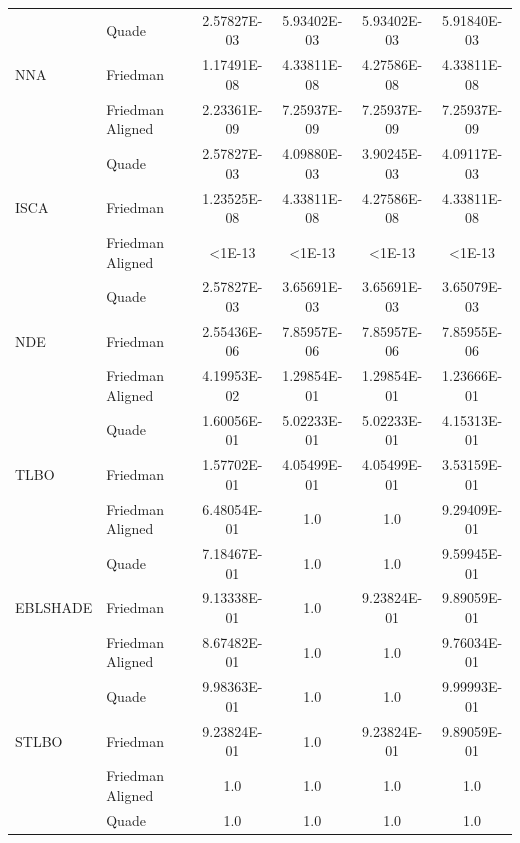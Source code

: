 \documentclass[a4paper,fleqn]{cas-dc}
\begin{document}
\begin{table}[<options>]
\begin{tabular*}{\tblwidth}{@{}LLCCCC@{}}
&Quade&2.57827E-03&5.93402E-03&5.93402E-03&5.91840E-03\\
NNA&Friedman&1.17491E-08&4.33811E-08&4.27586E-08&4.33811E-08\\
&Friedman Aligned&2.23361E-09&7.25937E-09&7.25937E-09&7.25937E-09\\
&Quade&2.57827E-03&4.09880E-03&3.90245E-03&4.09117E-03\\
ISCA&Friedman&1.23525E-08&4.33811E-08&4.27586E-08&4.33811E-08\\
&Friedman Aligned&<1E-13&<1E-13&<1E-13&<1E-13\\
&Quade&2.57827E-03&3.65691E-03&3.65691E-03&3.65079E-03\\
NDE&Friedman&2.55436E-06&7.85957E-06&7.85957E-06&7.85955E-06\\
&Friedman Aligned&4.19953E-02&1.29854E-01&1.29854E-01&1.23666E-01\\
&Quade&1.60056E-01&5.02233E-01&5.02233E-01&4.15313E-01\\
TLBO&Friedman&1.57702E-01&4.05499E-01&4.05499E-01&3.53159E-01\\
&Friedman Aligned&6.48054E-01&1.0&1.0&9.29409E-01\\
&Quade&7.18467E-01&1.0&1.0&9.59945E-01\\
EBLSHADE&Friedman&9.13338E-01&1.0&9.23824E-01&9.89059E-01\\
&Friedman Aligned&8.67482E-01&1.0&1.0&9.76034E-01\\
&Quade&9.98363E-01&1.0&1.0&9.99993E-01\\
STLBO&Friedman&9.23824E-01&1.0&9.23824E-01&9.89059E-01\\
&Friedman Aligned&1.0&1.0&1.0&1.0\\
&Quade&1.0&1.0&1.0&1.0\\
\bottomrule
\end{tabular*}
\end{table}
\end{document}
